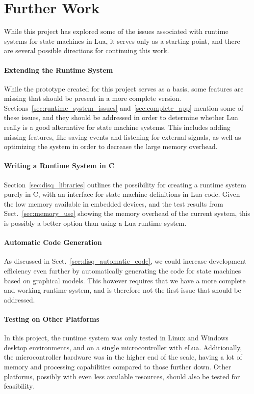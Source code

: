 \section{Further Work}
\label{sec:further_work}
While this project has explored some of the issues associated with runtime systems for state machines in Lua, it serves only as a starting point, and there are several possible directions for continuing this work.

\paragraph{Extending the Runtime System} While the prototype created for this project serves as a basis, some features are missing that should be present in a more complete version. Sections~\ref{sec:runtime_system_issues} and~\ref{sec:complete_app} mention some of these issues, and they should be addressed in order to determine whether Lua really is a good alternative for state machine systems. This includes adding missing features, like saving events and listening for external signals, as well as optimizing the system in order to decrease the large memory overhead.

\paragraph{Writing a Runtime System in C} Section~\ref{sec:disq_libraries} outlines the possibility for creating a runtime system purely in C, with an interface for state machine definitions in Lua code. Given the low memory available in embedded devices, and the test results from Sect.~\ref{sec:memory_use} showing the memory overhead of the current system, this is possibly a better option than using a Lua runtime system.

\paragraph{Automatic Code Generation} As discussed in Sect.~\ref{sec:disq_automatic_code}, we could increase development efficiency even further by automatically generating the code for state machines based on graphical models. This however requires that we have a more complete and working runtime system, and is therefore not the first issue that should be addressed.

\paragraph{Testing on Other Platforms} In this project, the runtime system was only tested in Linux and Windows desktop environments, and on a single microcontroller with eLua. Additionally, the microcontroller hardware was in the higher end of the scale, having a lot of memory and processing capabilities compared to those further down. Other platforms, possibly with even less available resources, should also be tested for feasibility.

